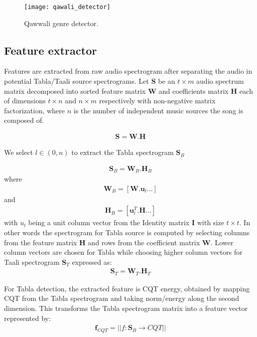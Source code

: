 \documentclass{article}
\begin{document}
\begin{figure}[htbp]
  \centering
  \texttt{[image: qawali\_detector]}
  \caption{Qawwali genre detector.}
\label{fig:block_dia}
\end{figure}

\subsection{Feature extractor}

Features are extracted from raw audio spectrogram after separating the audio in potential Tabla/Taali source spectrograms. Let $\boldsymbol{S}$ be an ${t\times  m}$ audio spectrum matrix decomposed into sorted feature matrix $\boldsymbol{W}$ and coefficients matrix $\boldsymbol{H}$ each of dimensions ${t\times n}$ and ${n\times m}$ respectively with non-negative matrix factorization, where $n$ is the number of independent music sources the song is composed of.

\begin{align}\label{eq:eq1}
\boldsymbol{S} = \boldsymbol{W}.\boldsymbol{H}
\end{align}

We select $l \in (0,n)$ to extract the Tabla spectrogram $\boldsymbol{S}_{B}$ 

\begin{align}\label{eq:eq2}
\boldsymbol{S}_{B} = \boldsymbol{W}_{B}.\boldsymbol{H}_{B}
\end{align}
where
\begin{align}\label{eq:eq3}
\boldsymbol{W}_{B} = [\boldsymbol{W}.\boldsymbol{u}_{l} ...]
\end{align}
and 
\begin{align}\label{eq:eq4}
\boldsymbol{H}_{B} = [\boldsymbol{u}_{l}^T.\boldsymbol{H} ...]
\end{align}
with $u_{l}$ being a unit column vector from the Identity matrix $\boldsymbol{I}$ with size ${t\times t}$. In other words the spectrogram for Tabla source is computed
by selecting columns from the feature matrix $\boldsymbol{H}$ and rows from the coefficient matrix $\boldsymbol{W}$. Lower column vectors are chosen for Tabla while choosing higher column vectors for Taali spectrogram $\boldsymbol{S}_{T}$ expressed as:
\begin{align}\label{eq:eq5}
\boldsymbol{S}_{T} = \boldsymbol{W}_{T}.\boldsymbol{H}_{T}
\end{align}

For Tabla detection, the extracted feature is CQT energy, obtained by mapping CQT from the Tabla spectrogram and taking norm/energy along the second dimension. This transforms the Tabla spectrogram matrix into a feature vector represented by:
\begin{align}\label{eq:eq6}
\boldsymbol{f}_{CQT} = \lvert \lvert f\colon \boldsymbol{S}_{B}\to CQT \rvert \rvert
\end{align}
\end{document}
